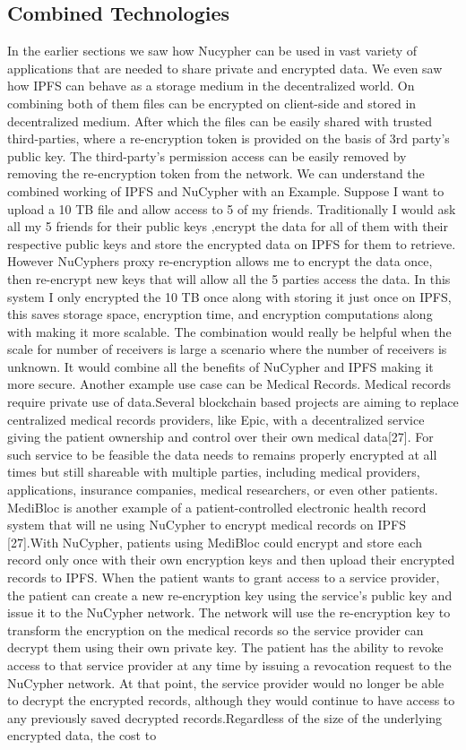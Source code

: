\documentclass[12pt]{article}
\begin{document}
\subsection{Combined Technologies}
In the earlier sections we saw how Nucypher can be used in vast variety of applications that are needed to share private and encrypted data. We even saw how IPFS can behave as a storage medium in the decentralized world. On combining both of them files can be encrypted on client-side and stored in decentralized medium. After which the files can be easily shared with trusted third-parties, where a re-encryption token is provided on the basis of 3rd party’s public key. The third-party’s permission access can be easily removed by removing the re-encryption token from the network. We can understand the combined working of IPFS and NuCypher with an Example. Suppose I want to upload a 10 TB file and allow access to 5 of my friends. Traditionally I would ask all my 5 friends for their public keys ,encrypt the data for all of them with their respective public keys and store the encrypted data on IPFS for them to retrieve. However NuCyphers proxy re-encryption allows me to encrypt the data once, then re-encrypt new keys that will allow all the 5 parties access the data. In this system I only encrypted the 10 TB once along with storing it just once on IPFS, this saves storage space, encryption time, and encryption computations along with making it more scalable. The combination would really be helpful when the scale for number of receivers is large a scenario where the number of receivers is unknown. It would combine all the benefits of NuCypher and IPFS making it more secure. Another example use case can be Medical Records. Medical records require private use of data.Several blockchain based projects are aiming to replace centralized medical records providers, like Epic, with a decentralized service giving the patient ownership and control over their own medical data[27]. For such service to be feasible the data needs to remains properly encrypted at all times but still shareable with multiple parties, including medical providers, applications, insurance companies, medical researchers, or even other patients. MediBloc is another example of a patient-controlled electronic health record system that will ne using NuCypher to encrypt medical records on IPFS [27].With NuCypher, patients using MediBloc could encrypt and store each record only once with their own encryption keys and then upload their encrypted records to IPFS. When the patient wants to grant access to a service provider,  the patient can create a new re-encryption key using the service’s public key and issue it to the NuCypher network. The network will use the re-encryption key to transform the encryption on the medical records so the service provider can decrypt them using their own private key. The patient has the ability to revoke access to that service provider at any time by issuing a revocation request to the NuCypher network. At that point, the service provider would no longer be able to decrypt the encrypted records, although they would continue to have access to any previously saved decrypted records.Regardless of the size of the underlying encrypted data, the cost to 
\end{document}
